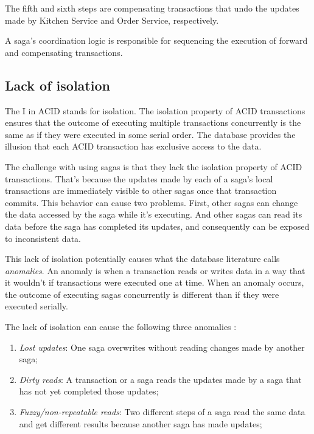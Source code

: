 \documentclass[conference]{IEEEtran}
\begin{document}
The fifth and sixth steps are compensating transactions that undo the updates made by Kitchen Service and Order Service, respectively.

A saga’s coordination logic is responsible for sequencing the execution of forward and compensating transactions. \cite{microservices-patterns}

\subsection{Lack of isolation}

The I in ACID stands for isolation. The isolation property of ACID transactions ensures that the outcome of executing multiple transactions concurrently is the same as if they were executed in some serial order. The database provides the illusion that each ACID transaction has exclusive access to the data.

The challenge with using sagas is that they lack the isolation property of ACID transactions. That’s because the updates made by each of a saga’s local transactions are immediately visible to other sagas once that transaction commits. This behavior can cause two problems. First, other sagas can change the data accessed by the saga while it’s executing. And other sagas can read its data before the saga has completed its updates, and consequently can be exposed to inconsistent data.

This lack of isolation potentially causes what the database literature calls \textit{anomalies}. An anomaly is when a transaction reads or writes data in a way that it wouldn’t if transactions were executed one at time. When an anomaly occurs, the outcome of executing sagas concurrently is different than if they were executed serially.

The lack of isolation can cause the following three anomalies \cite{microservices-patterns}:

\begin{enumerate}
  \item \textit{Lost updates}: One saga overwrites without reading changes made by another saga;
  \item \textit{Dirty reads}: A transaction or a saga reads the updates made by a saga that has not yet completed those updates;
  \item \textit{Fuzzy/non-repeatable reads}: Two different steps of a saga read the same data and get different results because another saga has made updates;
\end{enumerate}
\end{document}
